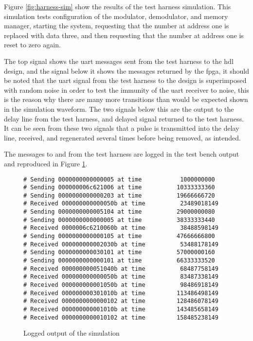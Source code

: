 Figure \ref{fig:harness-sim} show the results of the test harness simulation. This simulation tests configuration of the modulator, demodulator, and memory manager, starting the system, requesting that the number at address one is replaced with data three, and then requesting that the number at address one is reset to zero again.

The top signal shows the \gls{uart} messages sent from the test harness to the \gls{hdl} design, and the signal below it shows the messages returned by the \gls{fpga}, it should be noted that the \gls{uart} signal from the test harness to the design is superimposed with random noise in order to test the immunity of the \gls{uart} receiver to noise, this is the reason why there are many more transitions than would be expected shown in the simulation waveform. The two signals below this are the output to the delay line from the test harness, and delayed signal returned to the test harness. It can be seen from these two signals that a pulse is transmitted into the delay line, received, and regenerated several times before being removed, as intended.

The messages to and from the test harness are logged in the test bench output and reproduced in Figure \ref{fig:harness-sim-log}.

\begin{figure}[ht]
	\centering
	\begin{lstlisting}
# Sending 0000000000000005 at time           1000000000
# Sending 000000006c621006 at time          10333333360
# Sending 0000000000000203 at time          19666666720
# Received 000000000000050b at time          23489018149
# Sending 0000000000005104 at time          29000000080
# Sending 0000000000000005 at time          38333333440
# Received 0000006c6210060b at time          38488598149
# Sending 0000000000000105 at time          47666666800
# Received 000000000002030b at time          53488178149
# Sending 0000000000030101 at time          57000000160
# Sending 0000000000000101 at time          66333333520
# Received 000000000051040b at time          68487758149
# Received 000000000000050b at time          83487338149
# Received 000000000001050b at time          98486918149
# Received 000000000301010b at time         113486498149
# Received 0000000000000102 at time         128486078149
# Received 000000000001010b at time         143485658149
# Received 0000000000010102 at time         158485238149
	\end{lstlisting}
	\caption{Logged output of the simulation}
	\label{fig:harness-sim-log}
\end{figure}

